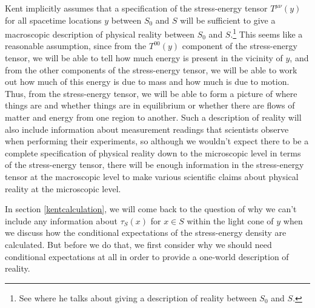\documentclass[12pt]{report}
\begin{document}
Kent implicitly assumes that a specification of the stress-energy tensor $T^{\mu\nu}(y)$ for all spacetime locations $y$ between $S_0$ and $S$ will be sufficient to give a macroscopic description of physical reality between $S_0$ and $S$.\footnote{See \cite[2]{Kent2014} where he talks about giving a description of reality between $S_0$ and $S$.} This seems like a reasonable assumption, since from the $T^{00}(y)$ component of the stress-energy tensor, we will be able to tell how much energy is present in the vicinity of $y$, and from the other components of the stress-energy tensor, we will be able to work out how much of this energy is due to mass and how much is due to motion. Thus, from the stress-energy tensor, we will be able to form a picture of where things are and whether things are in equilibrium or whether there are flows of matter and energy from one region to another. Such a description of reality will also include information about measurement readings that scientists observe when performing their experiments, so although  we wouldn't expect there to be a complete specification of physical reality down to the microscopic level in terms of the stress-energy tensor, there will be enough information in the stress-energy tensor at the macroscopic level to make various scientific claims about physical reality at the microscopic level. 

In section \ref{kentcalculation}, we will come back to the question of why we can't include any information about $\tau_S(x)$ for $x\in S$ within the light cone of $y$ when we discuss how the conditional expectations of the stress-energy density are calculated. But before we do that, we first consider why we should need conditional expectations at all in order to provide a one-world description of reality.
\end{document}
